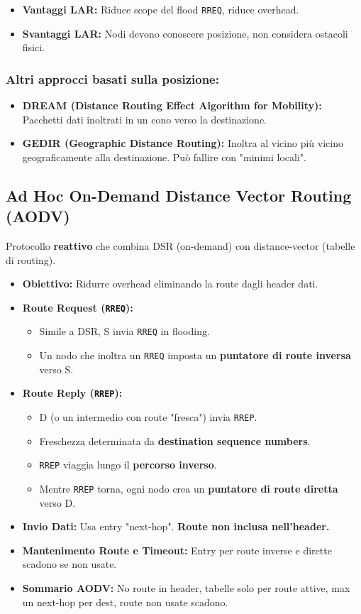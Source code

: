 \begin{itemize}
    \item \textbf{Vantaggi LAR:} Riduce scope del flood \texttt{RREQ}, riduce overhead.
    \item \textbf{Svantaggi LAR:} Nodi devono conoscere posizione, non considera ostacoli fisici.
\end{itemize}

\subsubsection{Altri approcci basati sulla posizione:}
\begin{itemize}
    \item \textbf{DREAM (Distance Routing Effect Algorithm for Mobility):} Pacchetti dati inoltrati in un cono verso la destinazione.
    \item \textbf{GEDIR (Geographic Distance Routing):} Inoltra al vicino più vicino geograficamente alla destinazione. Può fallire con "minimi locali".
\end{itemize}

\subsection{Ad Hoc On-Demand Distance Vector Routing (AODV)}
Protocollo \textbf{reattivo} che combina DSR (on-demand) con distance-vector (tabelle di routing).
\begin{itemize}
    \item \textbf{Obiettivo:} Ridurre overhead eliminando la route dagli header dati.
    \item \textbf{Route Request (\texttt{RREQ}):}
    \begin{itemize}
        \item Simile a DSR, S invia \texttt{RREQ} in flooding.
        \item Un nodo che inoltra un \texttt{RREQ} imposta un \textbf{puntatore di route inversa} verso S.
    \end{itemize}
    \item \textbf{Route Reply (\texttt{RREP}):}
    \begin{itemize}
        \item D (o un intermedio con route "fresca") invia \texttt{RREP}.
        \item Freschezza determinata da \textbf{destination sequence numbers}.
        \item \texttt{RREP} viaggia lungo il \textbf{percorso inverso}.
        \item Mentre \texttt{RREP} torna, ogni nodo crea un \textbf{puntatore di route diretta} verso D.
    \end{itemize}
    \item \textbf{Invio Dati:} Usa entry "next-hop". \textbf{Route non inclusa nell'header.}
    \item \textbf{Mantenimento Route e Timeout:} Entry per route inverse e dirette scadono se non usate.
    \item \textbf{Sommario AODV:} No route in header, tabelle solo per route attive, max un next-hop per dest, route non usate scadono.
\end{itemize}

